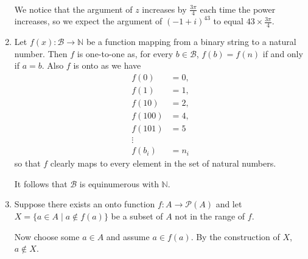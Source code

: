 \documentclass[a4paper]{article}
\begin{document}
\begin{enumerate}
		\begin{center}
			 $\qquad$
		\end{center}
		
		We notice that the argument of $z$ increases by $\tfrac{3 \pi}{4}$ each time the power increases, so we expect the argument of $(-1+i)^{43}$ to equal $43 \times \tfrac{3 \pi}{4}$.
		
		\item Let $f(x): \mathcal{B} \to \mathbb{N}$ be a function mapping from a binary string to a natural number. Then $f$ is one-to-one as, for every $b \in \mathcal{B}$, $f(b) = f(n)$ if and only if $a = b$. Also $f$ is onto as we have
		\begin{align*}
			f(0) &= 0, \\
			f(1) &= 1, \\
			f(10) &= 2,\\
			f(100) &= 4, \\
			f(101) &= 5 \\
			\vdots \\
			f(b_i) &= n_i
		\end{align*}
		so that $f$ clearly maps to every element in the set of natural numbers.
		
		It follows that  $\mathcal{B}$ is equinumerous with $\mathbb{N}$.
		
		\item Suppose there exists an onto function $f:A \to \mathcal P (A)$ and let $X = \{a \in A \mid a \notin f(a) \}$ be a subset of $A$ not in the range of $f$.
		
		Now choose some $a \in A$ and assume $a \in f(a)$. By the construction of $X$, $a \notin X$.
		

\end{enumerate}
\end{document}
